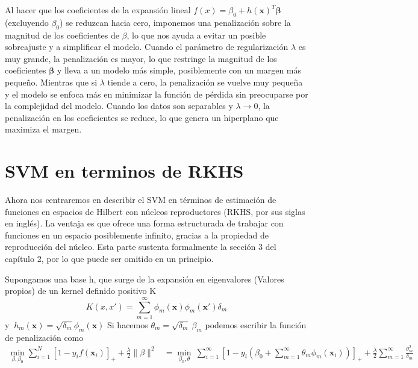 \documentclass[letterpaper,12pt,oneside]{book}
\begin{document}
{{{{{Al hacer que los coeficientes de la expansión lineal \(f(x) = \beta_0 + h(\mathbf{x})^T \boldsymbol{\beta}\) (excluyendo \(\beta_0\)) se reduzcan hacia cero, imponemos una penalización sobre la magnitud de los coeficientes de \(\beta\), lo que nos ayuda a evitar un posible sobreajuste y a simplificar el modelo. Cuando el parámetro de regularización \(\lambda\) es muy grande, la penalización es mayor, lo que restringe la magnitud de los coeficientes \(\boldsymbol{\beta}\) y lleva a un modelo más simple, posiblemente con un margen más pequeño. Mientras que si \(\lambda\) tiende a cero, la penalización se vuelve muy pequeña y el modelo se enfoca más en minimizar la función de pérdida sin preocuparse por la complejidad del modelo. Cuando los datos son separables y $\lambda \rightarrow 0$, la penalización en los coeficientes se reduce, lo que genera un hiperplano que maximiza el margen.

}

\section{SVM en terminos de RKHS}
Ahora nos centraremos en describir el SVM en términos de estimación de funciones en espacios de Hilbert con núcleos reproductores (RKHS, por sus siglas en inglés). La ventaja es que ofrece una forma estructurada de trabajar con funciones en un espacio posiblemente infinito, gracias a la propiedad de reproducción del núcleo. Esta parte sustenta formalmente la sección 3 del capítulo 2, por lo que puede ser omitido en un principio.


   Supongamos una base h, que surge de la expansión en eigenvalores (Valores propios) de un kernel definido positivo K 
    \begin{equation}
           K(x,x') = \sum_{m=1}^{\infty} \phi_m(\mathbf{x})\phi_m(\mathbf{x}')\delta_m
    \end{equation}
    y $\ h_m(\mathbf{x}) = \sqrt{\delta_m} \phi_m(\mathbf{x})$ Si hacemos $\theta_m = \sqrt{\delta_m} \ \beta_m$ podemos escribir la función de penalización como 
    \begin{align}
        \min_{\beta,\beta_0} \sum_{i=1}^{N} \left[1 - y_i f(\mathbf{x}_i)\right]_+ + \frac{\lambda}{2} \|\beta\|^2 &= \min_{\beta_0,\theta} \ \sum_{i=1}^{\infty} \left[1 - y_i \left(\beta_0 + \sum_{m=1}^{\infty} \theta_m \phi_m(\mathbf{x}_i)\right)\right]_+ + \frac{\lambda}{2} \sum_{m=1}^{\infty} \frac{\theta_m^2}{\delta_m}
    \end{align}
        
}}}}
\end{document}
